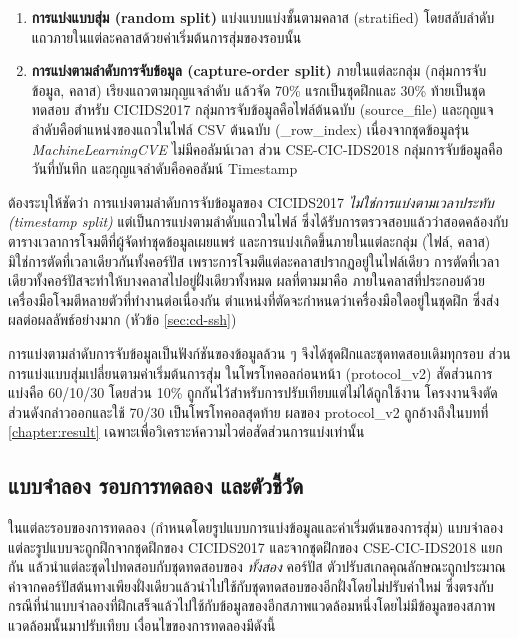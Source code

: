 \begin{enumerate}
    \item \textbf{การแบ่งแบบสุ่ม (random split)} แบ่งแบบแบ่งชั้นตามคลาส (stratified) โดยสลับลำดับแถวภายในแต่ละคลาสด้วยค่าเริ่มต้นการสุ่มของรอบนั้น
    \item \textbf{การแบ่งตามลำดับการจับข้อมูล (capture-order split)} ภายในแต่ละกลุ่ม (กลุ่มการจับข้อมูล, คลาส) เรียงแถวตามกุญแจลำดับ แล้วจัด 70\% แรกเป็นชุดฝึกและ 30\% ท้ายเป็นชุดทดสอบ สำหรับ CICIDS2017 กลุ่มการจับข้อมูลคือไฟล์ต้นฉบับ (source\_file) และกุญแจลำดับคือตำแหน่งของแถวในไฟล์ CSV ต้นฉบับ (\_row\_index) เนื่องจากชุดข้อมูลรุ่น \textit{MachineLearningCVE} ไม่มีคอลัมน์เวลา ส่วน CSE-CIC-IDS2018 กลุ่มการจับข้อมูลคือวันที่บันทึก และกุญแจลำดับคือคอลัมน์ Timestamp
\end{enumerate}

ต้องระบุให้ชัดว่า การแบ่งตามลำดับการจับข้อมูลของ CICIDS2017 \emph{ไม่ใช่การแบ่งตามเวลาประทับ (timestamp split)} แต่เป็นการแบ่งตามลำดับแถวในไฟล์ ซึ่งได้รับการตรวจสอบแล้วว่าสอดคล้องกับตารางเวลาการโจมตีที่ผู้จัดทำชุดข้อมูลเผยแพร่ และการแบ่งเกิดขึ้นภายในแต่ละกลุ่ม (ไฟล์, คลาส) มิใช่การตัดที่เวลาเดียวกันทั้งคอร์ปัส เพราะการโจมตีแต่ละคลาสปรากฏอยู่ในไฟล์เดียว การตัดที่เวลาเดียวทั้งคอร์ปัสจะทำให้บางคลาสไปอยู่ฝั่งเดียวทั้งหมด ผลที่ตามมาคือ ภายในคลาสที่ประกอบด้วยเครื่องมือโจมตีหลายตัวที่ทำงานต่อเนื่องกัน ตำแหน่งที่ตัดจะกำหนดว่าเครื่องมือใดอยู่ในชุดฝึก ซึ่งส่งผลต่อผลลัพธ์อย่างมาก (หัวข้อ \ref{sec:cd-ssh})

การแบ่งตามลำดับการจับข้อมูลเป็นฟังก์ชันของข้อมูลล้วน ๆ จึงได้ชุดฝึกและชุดทดสอบเดิมทุกรอบ ส่วนการแบ่งแบบสุ่มเปลี่ยนตามค่าเริ่มต้นการสุ่ม ในโพรโทคอลก่อนหน้า (protocol\_v2) สัดส่วนการแบ่งคือ 60/10/30 โดยส่วน 10\% ถูกกันไว้สำหรับการปรับเทียบแต่ไม่ได้ถูกใช้งาน โครงงานจึงตัดส่วนดังกล่าวออกและใช้ 70/30 เป็นโพรโทคอลสุดท้าย ผลของ protocol\_v2 ถูกอ้างถึงในบทที่ \ref{chapter:result} เฉพาะเพื่อวิเคราะห์ความไวต่อสัดส่วนการแบ่งเท่านั้น

\subsection{แบบจำลอง รอบการทดลอง และตัวชี้วัด}

ในแต่ละรอบของการทดลอง (กำหนดโดยรูปแบบการแบ่งข้อมูลและค่าเริ่มต้นของการสุ่ม) แบบจำลองแต่ละรูปแบบจะถูกฝึกจากชุดฝึกของ CICIDS2017 และจากชุดฝึกของ CSE-CIC-IDS2018 แยกกัน แล้วนำแต่ละชุดไปทดสอบกับชุดทดสอบของ \emph{ทั้งสอง} คอร์ปัส ตัวปรับสเกลคุณลักษณะถูกประมาณค่าจากคอร์ปัสต้นทางเพียงฝั่งเดียวแล้วนำไปใช้กับชุดทดสอบของอีกฝั่งโดยไม่ปรับค่าใหม่ ซึ่งตรงกับกรณีที่นำแบบจำลองที่ฝึกเสร็จแล้วไปใช้กับข้อมูลของอีกสภาพแวดล้อมหนึ่งโดยไม่มีข้อมูลของสภาพแวดล้อมนั้นมาปรับเทียบ เงื่อนไขของการทดลองมีดังนี้

